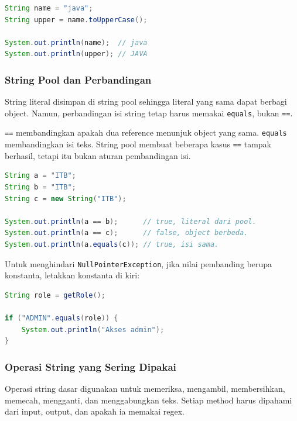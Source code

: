 \begin{lstlisting}[language=Java, caption={Operasi String menghasilkan object baru}, label={lst:string-immutable}]
String name = "java";
String upper = name.toUpperCase();

System.out.println(name);  // java
System.out.println(upper); // JAVA
\end{lstlisting}

\subsubsection{String Pool dan Perbandingan}

\begin{jawab}
String literal disimpan di string pool sehingga literal yang sama dapat berbagi object. Namun, perbandingan isi string tetap harus memakai \texttt{equals}, bukan \texttt{==}.
\end{jawab}

\texttt{==} membandingkan apakah dua reference menunjuk object yang sama. \texttt{equals} membandingkan isi teks. String pool membuat beberapa kasus \texttt{==} tampak berhasil, tetapi itu bukan aturan pembandingan isi.

\begin{lstlisting}[language=Java, caption={Perbedaan == dan equals pada String}, label={lst:string-equals}]
String a = "ITB";
String b = "ITB";
String c = new String("ITB");

System.out.println(a == b);      // true, literal dari pool.
System.out.println(a == c);      // false, object berbeda.
System.out.println(a.equals(c)); // true, isi sama.
\end{lstlisting}

Untuk menghindari \texttt{NullPointerException}, jika nilai pembanding berupa konstanta, letakkan konstanta di kiri:

\begin{lstlisting}[language=Java, caption={Null-safe equals dengan konstanta}, label={lst:null-safe-string-equals}]
String role = getRole();

if ("ADMIN".equals(role)) {
    System.out.println("Akses admin");
}
\end{lstlisting}

\subsubsection{Operasi String yang Sering Dipakai}

\begin{jawab}
Operasi string dasar digunakan untuk memeriksa, mengambil, membersihkan, memecah, mengganti, dan menggabungkan teks. Setiap method harus dipahami dari input, output, dan apakah ia memakai regex.
\end{jawab}


